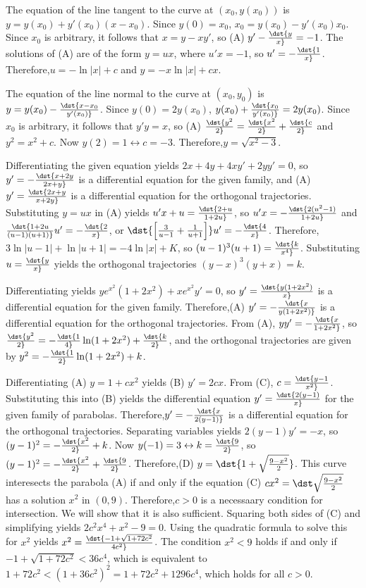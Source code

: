 \documentclass[dvips]{book}
\renewcommand{\exer}[1]{\par\medskip\;\noindent{\color{red}\bf #1.}}
\numberwithin{example}{section}
\numberwithin{equation}{section}
\numberwithin{theorem}{section}
\numberwithin{table}{section}
\numberwithin{figure}{section}
\begin{document}
\exer{4.5.22}
The equation of the line tangent to the curve at $(x_0,y(x_0))$ is
$y=y(x_0)+y'(x_0)(x-x_0)$. Since $y(0)=x_0$, $x_0=y(x_0)-y'(x_0)x_0$.
Since $x_0$ is arbitrary, it follows that $x=y-xy'$, so (A)
$y'-\dst{y\over x}=-1$. The solutions of (A) are of the form $y=ux$,
where $u'x=-1$, so $u'=-\dst{1\over x}$. Therefore,$u=-\ln|x|+c$ and
$y=-x\ln|x|+cx$.


\exer{4.5.24}
The equation of the line normal to the curve at $(x_0,y_0)$ is
$y=y(x_0)-\dst{x-x_0\over y'(x_0)}$. Since $y(0)=2y(x_0)$,
$y(x_0)+\dst{x_0\over y'(x_0)}=2y(x_0)$. Since $x_0$ is arbitrary, it
follows that $y'y=x$, so (A)
$\dst{y^2\over2}=\dst{x^2\over2}+\dst{c\over2}$ and $y^2=x^2+c$. Now
$y(2)=1\leftrightarrow c=-3$. Therefore,$y=\sqrt{x^2-3}$.


\exer{4.5.26}
Differentiating the given equation yields $2x+4y+4xy'+2yy'=0$, so
$y'=-\dst{x+2y\over2x+y}$ is a differential equation for the given
family, and (A) $y'=\dst{2x+y\over x+2y}$ is a differential equation
for the orthogonal trajectories. Substituting $y=ux$ in (A) yields
$u'x+u=\dst{2+u\over1+2u}$, so $u'x=-\dst{2(u^2-1)\over1+2u}$ and
$\dst{1+2u\over(u-1)(u+1)}u'=-\dst{2\over x}$, or $\dst{\left[{3\over
u-1}+{1\over u+1}\right]}u'=-\dst{4\over x}$. Therefore,
$3\ln|u-1|+\ln|u+1|=-4\ln|x|+K$, so $(u-1)^3(u+1)=\dst{k\over x^4}$.
Substituting $u=\dst{y\over x}$ yields the orthogonal trajectories
$(y-x)^3(y+x)=k$.


\exer{4.5.28}
Differentiating yields $ye^{x^2}(1+2x^2)+xe^{x^2}y'=0$, so
$y'=\dst{y(1+2x^2)\over x}$ is a differential equation for the given
family. Therefore,(A) $y'=-\dst{x\over y(1+2x^2)}$ is a differential
equation for the orthogonal trajectories. From (A),
$yy'=-\dst{x\over1+2x^2}$, so
$\dst{y^2\over2}=-\dst{1\over4}\ln(1+2x^2)+\dst{k\over2}$, and the
orthogonal trajectories are given by
$y^2=-\dst{1\over2}\ln(1+2x^2)+k$.


\exer{4.5.30}
Differentiating (A) $y=1+cx^2$ yields (B) $y'=2cx$. From (C),
$c=\dst{y-1\over x^2}$. Substituting this into (B) yields the
differential equation $y'=\dst{2(y-1)\over x}$ for the given family of
parabolas. Therefore,$y'=-\dst{x\over2(y-1)}$ is a differential
equation for the orthogonal trajectories. Separating variables yields
$2(y-1)y'=-x$, so $(y-1)^2=-\dst{x^2\over2}+k$. Now
$y(-1)=3\leftrightarrow k=\dst{9\over2}$, so
$(y-1)^2=-\dst{x^2\over2}+\dst{9\over2}$. Therefore,(D)
$y=\dst{1+\sqrt{9-x^2\over2}}$. This curve interesects the parabola
(A) if and only if the equation (C) $cx^2=\dst\sqrt{9-x^2\over2}$ has
a solution $x^2$ in $(0,9)$. Therefore,$c>0$ is a necessaary condition
for intersection. We will show that it is also sufficient. Squaring
both sides of (C) and simplifying yields $2c^2x^4+x^2-9=0$. Using the
quadratic formula to solve this for $x^2$ yields
$x^2=\dst{-1+\sqrt{1+72c^2}\over4c^2}$. The condition $x^2<9$ holds if
and only if $-1+\sqrt{1+72c^2}<36c^4$, which is equivalent to
$1+72c^2<(1+36c^2)^2=1+72c^2+1296c^4$, which holds for all $c>0$.
\end{document}
